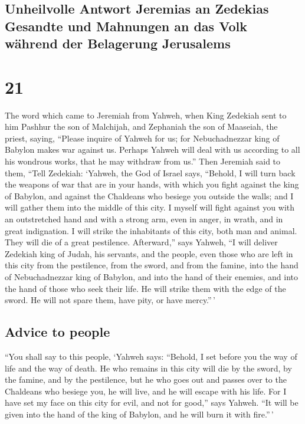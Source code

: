 \hypertarget{unheilvolle-antwort-jeremias-an-zedekias-gesandte-und-mahnungen-an-das-volk-wuxe4hrend-der-belagerung-jerusalems}{%
\subsection{Unheilvolle Antwort Jeremias an Zedekias Gesandte und
Mahnungen an das Volk während der Belagerung
Jerusalems}\label{unheilvolle-antwort-jeremias-an-zedekias-gesandte-und-mahnungen-an-das-volk-wuxe4hrend-der-belagerung-jerusalems}}

\hypertarget{section-20}{%
\section{21}\label{section-20}}

 The word which came to Jeremiah from Yahweh, when King
Zedekiah sent to him Pashhur the son of Malchijah, and Zephaniah the son
of Maaseiah, the priest, saying,  ``Please inquire of
Yahweh for us; for Nebuchadnezzar king of Babylon makes war against us.
Perhaps Yahweh will deal with us according to all his wondrous works,
that he may withdraw from us.''  Then Jeremiah said to
them, ``Tell Zedekiah:  `Yahweh, the God of Israel says,
``Behold, I will turn back the weapons of war that are in your hands,
with which you fight against the king of Babylon, and against the
Chaldeans who besiege you outside the walls; and I will gather them into
the middle of this city.  I myself will fight against you
with an outstretched hand and with a strong arm, even in anger, in
wrath, and in great indignation.  I will strike the
inhabitants of this city, both man and animal. They will die of a great
pestilence.  Afterward,'' says Yahweh, ``I will deliver
Zedekiah king of Judah, his servants, and the people, even those who are
left in this city from the pestilence, from the sword, and from the
famine, into the hand of Nebuchadnezzar king of Babylon, and into the
hand of their enemies, and into the hand of those who seek their life.
He will strike them with the edge of the sword. He will not spare them,
have pity, or have mercy.''\,'

\hypertarget{advice-to-people}{%
\subsection{Advice to people}\label{advice-to-people}}

 ``You shall say to this people, `Yahweh says: ``Behold, I
set before you the way of life and the way of death.  He
who remains in this city will die by the sword, by the famine, and by
the pestilence, but he who goes out and passes over to the Chaldeans who
besiege you, he will live, and he will escape with his life.
 For I have set my face on this city for evil, and not
for good,'' says Yahweh. ``It will be given into the hand of the king of
Babylon, and he will burn it with fire.''\,'

